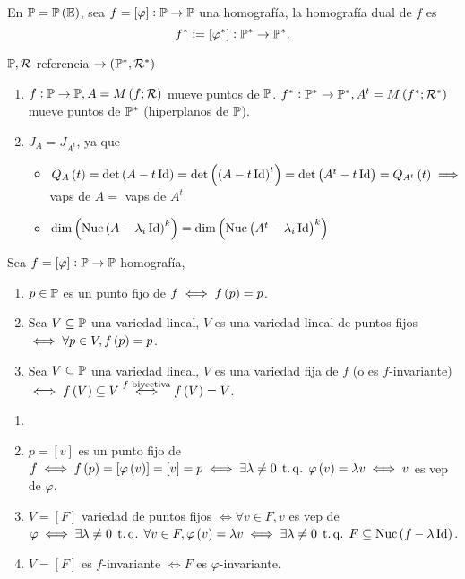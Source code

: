 \begin{defi}
	En $\mathbb{P} = \mathbb{P} \left(\mathbb{E}\right)$, sea $f = [\varphi] : \mathbb{P} \to \mathbb{P}$ una homografía, la homografía dual de $f$ es
	\[
		f^* := [\varphi^*] : \mathbb{P}^* \to \mathbb{P}^*.
	\]
\end{defi}
\begin{obs}
	$\mathbb{P}, \mathcal{R}$ referencia $\to \left(\mathbb{P}^*, \mathcal{R}^*\right)$
	\begin{enumerate}
		\item $f : \mathbb{P} \to \mathbb{P}, A = M \left( f; \mathcal{R}\right)$ mueve puntos de $\mathbb{P}$. $f^* : \mathbb{P}^* \to \mathbb{P}^*, A^t = M \left( f^*; \mathcal{R}^* \right)$ mueve puntos de $\mathbb{P}^*$ (hiperplanos de $\mathbb{P}$).
		\item $J_A = J_{A^t}$, ya que
			\begin{itemize}
			\item $Q_A \left( t \right) = \det\left( A- t\operatorname{Id}\right) = \det\left(\left( A-t\operatorname{Id}\right)^t\right) = \det\left( A^t-t\operatorname{Id}\right) = Q_{A^t} \left( t\right) \implies$ vaps de $A =$ vaps de $A^t$ 
			\item $\dim\left(\text{Nuc}\left( A-\lambda_i\operatorname{Id}\right)^k\right)=\dim\left(\text{Nuc}\left( A^t-\lambda_i\operatorname{Id}\right)^k\right)$
			\end{itemize}
	\end{enumerate}
\end{obs}
\begin{defi}
	Sea $f = [\varphi]: \mathbb{P} \to \mathbb{P}$ homografía,
	\begin{enumerate}
		\item $p \in \mathbb{P}$ es un punto fijo de $f \iff f\left( p \right) = p$.
		\item Sea $V \subseteq \mathbb{P}$ una variedad lineal, $V$ es una variedad lineal de puntos fijos $\iff \forall p \in V, f\left( p\right) = p$.
		\item Sea $V \subseteq \mathbb{P}$ una variedad lineal, $V$ es una variedad fija de $f$ (o es $f$-invariante) $\iff f\left( V\right) \subseteq V \stackrel{f \text{ biyectiva}}{\iff} f \left( V \right) = V$.
	\end{enumerate}
\end {defi}
\begin{obs}
	\begin{enumerate}
		\item[]
		\item $p = [v]$ es un punto fijo de $f \iff f\left( p\right) = [\varphi \left( v\right)] = [v] = p \iff \exists\lambda\neq 0 \operatorname{\;t.q.\;} \varphi\left( v\right)=\lambda v \iff v$ es vep de $\varphi$.
		\item $V=[F]$ variedad de puntos fijos $\iff \forall v \in F, v$ es vep de $\varphi \iff \exists\lambda\neq 0 \operatorname{\;t.q.\;} \forall v \in F, \varphi\left( v\right) = \lambda v \iff \exists \lambda \neq 0 \operatorname{\;t.q.\;} F \subseteq \text{Nuc}\left( f - \lambda\operatorname{Id}\right)$.
		\item $V = [F]$ es $f$-invariante $\iff F$ es $\varphi$-invariante.
	\end{enumerate}
\end{obs}
